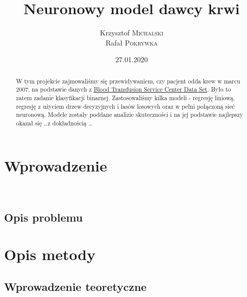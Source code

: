 \documentclass[11pt, a4paper, notitlepage]{report}
\author{Krzysztof \textsc{Michalski} \\ Rafał \textsc{Pokrywka} }
\title{\textbf{Neuronowy model dawcy krwi}}
\date{27.01.2020}
\begin{document}
\clearpage\maketitle
\thispagestyle{empty}
\begin{abstract}
	W tym projekcie zajmowaliśmy się przewidywaniem, czy pacjent odda krew w marcu 2007, na podstawie danych z \href{https://archive.ics.uci.edu/ml/datasets/Blood+Transfusion+Service+Center/}{Blood Transfusion Service Center Data Set}. 
	Było to zatem zadanie klasyfikacji binarnej. Zastosowaliśmy kilka modeli - regresję liniową, regresję z użyciem drzew decyzyjnych i lasów losowych oraz w pełni połączoną sieć neuronową. Modele zostały poddane analizie skuteczności i na jej podstawie
	najlepszy okazał się \ldots z dokładnością \ldots 
\end{abstract}

\clearpage \tableofcontents
\thispagestyle{empty}

\setcounter{page}{1}

\chapter{Wprowadzenie}
\lipsum[1]
\\
\lipsum[2]

\section{Opis problemu}
\lipsum[1-4]

\chapter{Opis metody}
\section{Wprowadzenie teoretyczne}
\lipsum[1]
\end{document}
